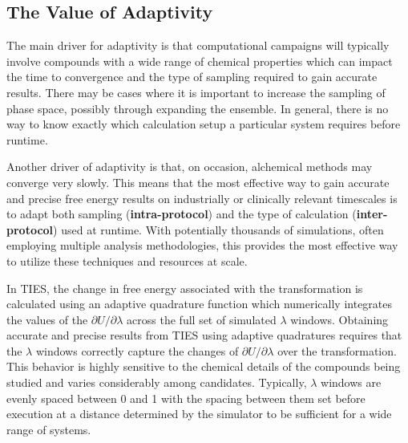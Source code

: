 %


\subsection{The Value of Adaptivity}\label{ssec:adapt_ties}

The main driver for adaptivity is that computational campaigns will typically
involve compounds with a wide range of chemical properties which can impact
the time to convergence %
and the type of sampling required to gain accurate results. There may be
cases where it is important to increase the sampling of phase space, possibly
through expanding the ensemble.
In general, there is no way to know exactly which calculation setup a
particular system requires before runtime.

Another driver of adaptivity is that, on occasion, alchemical methods may
converge very slowly. 
This means that the most effective way to gain accurate and precise free
energy results on industrially or clinically relevant timescales is 
to adapt both sampling (\textbf{intra-protocol}) and the type of calculation
(\textbf{inter-protocol}) used at runtime. With potentially thousands of
simulations, often employing multiple analysis methodologies, this provides
the most effective way to utilize these techniques and resources at scale.

In TIES, the change in free energy associated with the transformation is
calculated using an adaptive quadrature function which numerically integrates
the values of the $\partial U/\partial\lambda$ across the full set of
simulated $\lambda$ windows. Obtaining accurate and precise results from TIES
using adaptive quadratures requires that the $\lambda$ windows correctly
capture the changes of $\partial U/\partial\lambda$ over the transformation.
This behavior is highly sensitive to the chemical details of the compounds
being studied and varies considerably among candidates. Typically,
$\lambda$ windows are evenly spaced between 0 and 1 with the spacing between
them set before execution at a distance determined by the simulator to be
sufficient for a wide range of systems.


